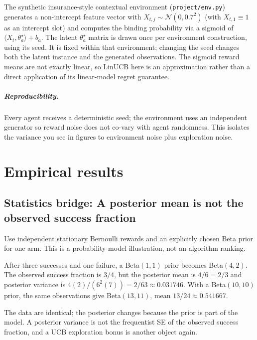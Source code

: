 \documentclass[11pt,oneside]{scrbook}
\begin{document}
The synthetic insurance-style contextual environment (\texttt{project/env.py}) generates a
non-intercept feature vector with $X_{t,j}\sim\mathcal{N}(0,0.7^2)$ (with $X_{t,1}\equiv 1$ as an intercept
slot) and computes the binding probability via a sigmoid of
$\langle X_t,\theta_a^\star\rangle + b_a$. The latent $\theta_a^\star$ matrix is
drawn once per environment construction, using its seed. It is fixed within
that environment; changing the seed changes both the latent instance and
the generated observations. The sigmoid reward means are not exactly linear,
so LinUCB here is an approximation rather than a direct application of its
linear-model regret guarantee.

\paragraph{Reproducibility.} Every agent receives a deterministic seed; the
environment uses an independent generator so reward noise does not co-vary with
agent randomness. This isolates the variance you see in figures to environment
noise plus exploration noise.

\chapter{Empirical results}

\section{Statistics bridge: A posterior mean is not the observed success fraction}
\begin{example}
Use independent stationary Bernoulli rewards and an explicitly chosen Beta prior for one arm. This is a probability-model illustration, not an algorithm ranking.

After three successes and one failure, a Beta$(1,1)$ prior becomes Beta$(4,2)$. The observed success fraction is $3/4$, but the posterior mean is $4/6=2/3$ and posterior variance is $4(2)/(6^2(7))=2/63\approx0.031746$. With a Beta$(10,10)$ prior, the same observations give Beta$(13,11)$, mean $13/24\approx0.541667$.
\end{example}
The data are identical; the posterior changes because the prior is part of the model. A posterior variance is not the frequentist SE of the observed success fraction, and a UCB exploration bonus is another object again.
\end{document}
